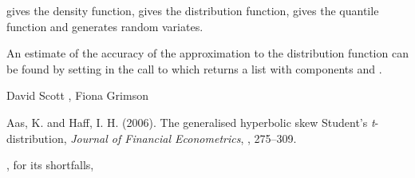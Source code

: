 \begin{Value}
 gives the density function,  gives the
distribution function,  gives the quantile function and
 generates random variates.

An estimate of the accuracy of the approximation to the distribution
function can be found by setting  in the call to
 which returns a list with components  and
.
\end{Value}
\begin{Author}\relax
David Scott , Fiona Grimson
\end{Author}
\begin{References}\relax
Aas, K. and Haff, I. H. (2006).
The generalised hyperbolic skew Student's \emph{t}-distribution,
\emph{Journal of Financial Econometrics}, , 275--309.
\end{References}
\begin{SeeAlso}\relax
{},  for
its shortfalls, 
\end{SeeAlso}


